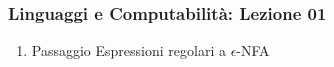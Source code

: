 




\begin{frame}[fragile]
	\frametitle{Linguaggi e Computabilità: Lezione 01}
\begin{enumerate}
\item
Passaggio Espressioni regolari a $\epsilon$-NFA
\end{enumerate}
\end{frame}



